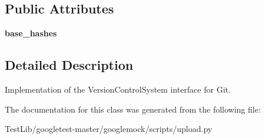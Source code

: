 \subsection*{Public Attributes}
\begin{DoxyCompactItemize}
\item 
\mbox{\label{classupload_1_1GitVCS_a07e9469050a157f34fe804cdf6ecddac}} 
{\bfseries base\+\_\+hashes}
\end{DoxyCompactItemize}


\subsection{Detailed Description}
\begin{DoxyVerb}Implementation of the VersionControlSystem interface for Git.\end{DoxyVerb}
 

The documentation for this class was generated from the following file\+:\begin{DoxyCompactItemize}
\item 
Test\+Lib/googletest-\/master/googlemock/scripts/upload.\+py\end{DoxyCompactItemize}
